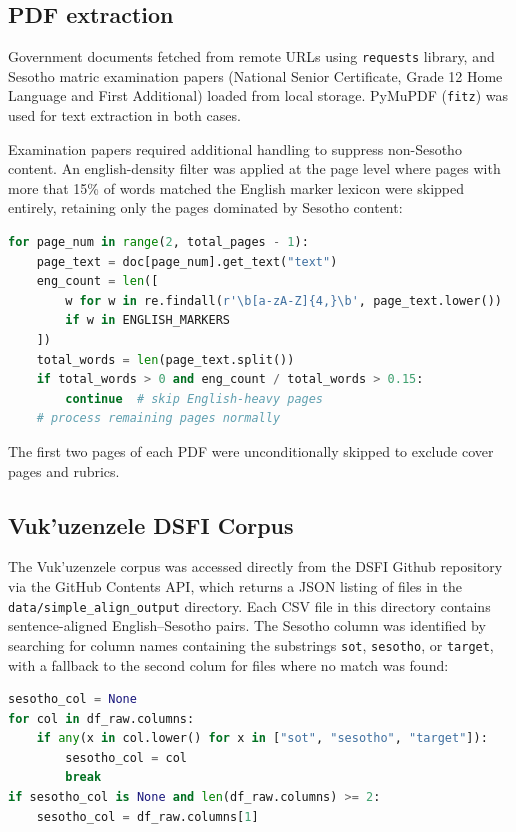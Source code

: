 \documentclass[11pt,a4paper]{article}
\begin{document}
\subsection{PDF extraction}

Government documents fetched from remote URLs using \texttt{requests} library, and Sesotho matric examination papers (National Senior Certificate, Grade 12 Home Language and First Additional) loaded from local storage. PyMuPDF (\texttt{fitz}) was used for text extraction in both cases. 

Examination papers required additional handling to suppress non-Sesotho content. An english-density filter was applied at the page level where pages with more that 15\% of words matched the English marker lexicon were skipped entirely, retaining only the pages dominated by Sesotho content:

\begin{lstlisting}[language=Python, caption={English-density page filter for exam PDF extraction.}, label={lst:pdf}]
for page_num in range(2, total_pages - 1):
    page_text = doc[page_num].get_text("text")
    eng_count = len([
        w for w in re.findall(r'\b[a-zA-Z]{4,}\b', page_text.lower())
        if w in ENGLISH_MARKERS
    ])
    total_words = len(page_text.split())
    if total_words > 0 and eng_count / total_words > 0.15:
        continue  # skip English-heavy pages
    # process remaining pages normally
\end{lstlisting}

The first two pages of each PDF were unconditionally skipped to exclude cover pages and rubrics.

\subsection{Vuk'uzenzele DSFI Corpus}

The Vuk'uzenzele corpus was accessed directly from the DSFI Github repository via the GitHub Contents API, which returns a JSON listing of files in the \texttt{data/simple\_align\_output} directory. Each CSV file in this directory contains sentence-aligned English--Sesotho pairs. The Sesotho column was identified by searching for column names containing the substrings \texttt{sot}, \texttt{sesotho}, or \texttt{target}, with a fallback to the second colum for files where no match was found:

\begin{lstlisting}[language=Python, caption={Vuk'uzenzele Sesotho column extraction.}, label={lst:vuku}]
sesotho_col = None
for col in df_raw.columns:
    if any(x in col.lower() for x in ["sot", "sesotho", "target"]):
        sesotho_col = col
        break
if sesotho_col is None and len(df_raw.columns) >= 2:
    sesotho_col = df_raw.columns[1]
\end{lstlisting}
\end{document}
